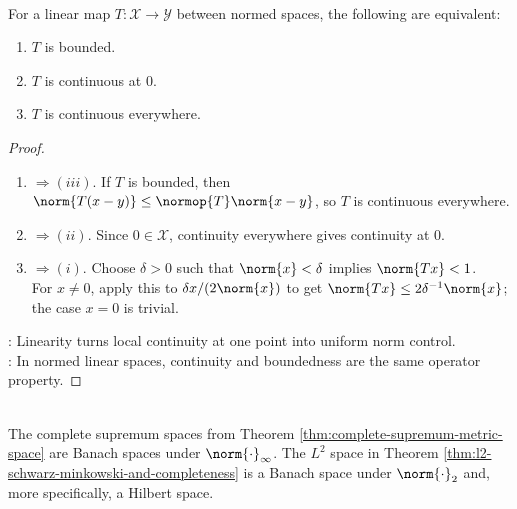 \begin{theorem} \label{thm:bounded-linear-map-continuity-equivalences} \\
For a linear map $T:\mathcal{X}\to\mathcal{Y}$ between normed spaces, the following are equivalent:
\begin{enumerate}[label=(\roman*)]
\setlength{\itemsep}{0pt}
\item $T$ is bounded.
\item $T$ is continuous at $0$.
\item $T$ is continuous everywhere.
\end{enumerate}
\begin{proof}
\begin{enumerate}[label=(\roman*).]
\setlength{\itemsep}{0pt}
\item[$(i)$] $\Rightarrow (iii)$. If $T$ is bounded, then $\norm{T(x-y)}\leq\normop{T}\norm{x-y}$, so $T$ is continuous everywhere.
\item[$(iii)$] $\Rightarrow (ii)$. Since $0\in\mathcal{X}$, continuity everywhere gives continuity at $0$.
\item[$(ii)$] $\Rightarrow (i)$. Choose $\delta>0$ such that $\norm{x}<\delta$ implies $\norm{Tx}<1$.\\
For $x\neq0$, apply this to $\delta x/(2\norm{x})$ to get $\norm{Tx}\leq2\delta^{-1}\norm{x}$; the case $x=0$ is trivial.
\end{enumerate}
: Linearity turns local continuity at one point into uniform norm control.\\
: In normed linear spaces, continuity and boundedness are the same operator property.
\end{proof}
\end{theorem}

\begin{example} \label{ex:standard-banach-space-examples} \\
The complete supremum spaces from Theorem \ref{thm:complete-supremum-metric-space} are Banach spaces under $\norm{\cdot}_{\infty}$. The $L^2$ space in Theorem \ref{thm:l2-schwarz-minkowski-and-completeness} is a Banach space under $\norm{\cdot}_2$ and, more specifically, a Hilbert space.
\end{example}
